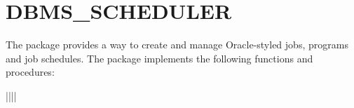 \documentclass[letterpaper,10pt,english,openany,oneside]{sphinxmanual}
\begin{document}
\newpage


\section{DBMS\_SCHEDULER}
\label{\detokenize{dbms_scheduler::doc}}\label{\detokenize{dbms_scheduler:dbms-scheduler}}
The  package provides a way to create and manage
Oracle-styled jobs, programs and job schedules. The 
package implements the following functions and procedures:


\begin{savenotes}\sphinxatlongtablestart\begin{longtable}{||||}
\hline

\endfirsthead

%
{}\\
\hline

\endhead

\hline
{}\\
\endfoot

\endlastfoot


\end{longtable}
\end{savenotes}
\end{document}
